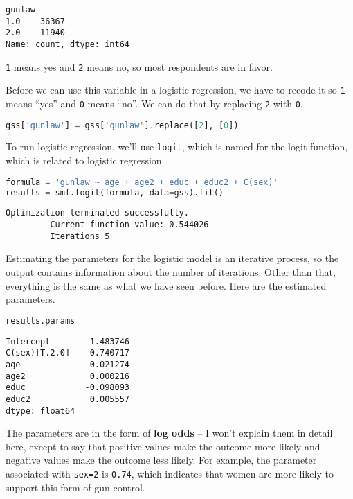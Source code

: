 \begin{lstlisting}[style=output]
gunlaw
1.0    36367
2.0    11940
Name: count, dtype: int64
\end{lstlisting}

\passthrough{\lstinline!1!} means yes and \passthrough{\lstinline!2!}
means no, so most respondents are in favor.

Before we can use this variable in a logistic regression, we have to
recode it so \passthrough{\lstinline!1!} means ``yes'' and
\passthrough{\lstinline!0!} means ``no''. We can do that by replacing
\passthrough{\lstinline!2!} with \passthrough{\lstinline!0!}.

\begin{lstlisting}[language=Python,style=source]
gss['gunlaw'] = gss['gunlaw'].replace([2], [0])
\end{lstlisting}

To run logistic regression, we'll use \passthrough{\lstinline!logit!},
which is named for the logit function, which is related to logistic
regression.

\begin{lstlisting}[language=Python,style=source]
formula = 'gunlaw ~ age + age2 + educ + educ2 + C(sex)'
results = smf.logit(formula, data=gss).fit()
\end{lstlisting}

\begin{lstlisting}[style=output]
Optimization terminated successfully.
         Current function value: 0.544026
         Iterations 5
\end{lstlisting}

Estimating the parameters for the logistic model is an iterative
process, so the output contains information about the number of
iterations. Other than that, everything is the same as what we have seen
before. Here are the estimated parameters.

\begin{lstlisting}[language=Python,style=source]
results.params
\end{lstlisting}

\begin{lstlisting}[style=output]
Intercept        1.483746
C(sex)[T.2.0]    0.740717
age             -0.021274
age2             0.000216
educ            -0.098093
educ2            0.005557
dtype: float64
\end{lstlisting}

The parameters are in the form of \textbf{log odds} -- I won't explain
them in detail here, except to say that positive values make the outcome
more likely and negative values make the outcome less likely. For
example, the parameter associated with \passthrough{\lstinline!sex=2!}
is \passthrough{\lstinline!0.74!}, which indicates that women are more
likely to support this form of gun control.

